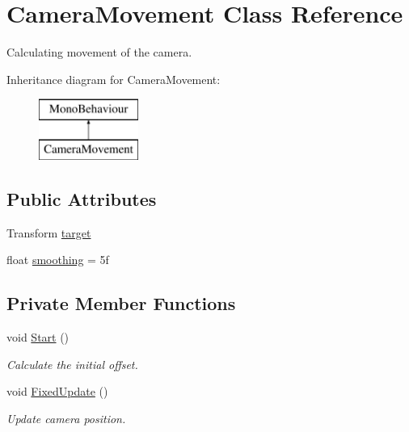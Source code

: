 \hypertarget{class_camera_movement}{}\section{Camera\+Movement Class Reference}
\label{class_camera_movement}


Calculating movement of the camera.  


Inheritance diagram for Camera\+Movement\+:\begin{figure}[H]
\begin{center}
\leavevmode
\includegraphics[height=2.000000cm]{class_camera_movement}
\end{center}
\end{figure}
\subsection*{Public Attributes}
\begin{DoxyCompactItemize}
\item 
Transform \mbox{\hyperlink{class_camera_movement_a260db5e549bc85e522e0c165e425fac6}{target}}
\item 
float \mbox{\hyperlink{class_camera_movement_ac54d2d4baa94f39db3c41ac60ddb57a3}{smoothing}} = 5f
\end{DoxyCompactItemize}
\subsection*{Private Member Functions}
\begin{DoxyCompactItemize}
\item 
void \mbox{\hyperlink{class_camera_movement_a3d5bf0407152d0e16efafa655bfc15e9}{Start}} ()
\begin{DoxyCompactList}\small\item\em Calculate the initial offset. \end{DoxyCompactList}\item 
void \mbox{\hyperlink{class_camera_movement_aa245255484cfc41547a4e1eaa8cf07ea}{Fixed\+Update}} ()
\begin{DoxyCompactList}\small\item\em Update camera position. \end{DoxyCompactList}\end{DoxyCompactItemize}

